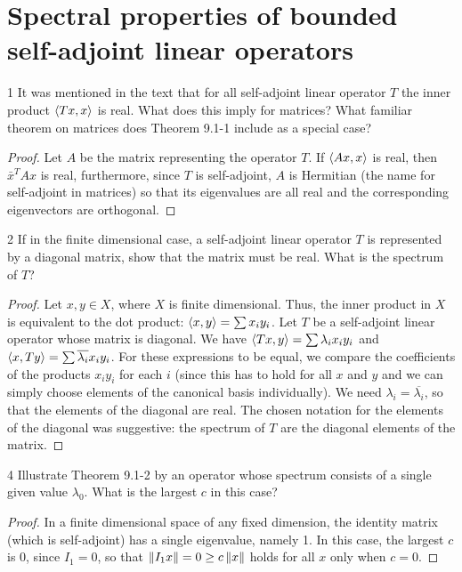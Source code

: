 \section{Spectral properties of bounded self-adjoint linear operators}


\begin{exercise}{1}
It was mentioned in the text that for all self-adjoint linear operator $T$ the inner product $\langle Tx, x\rangle$ is real.
What does this imply for matrices?
What familiar theorem on matrices does Theorem 9.1-1 include as a special case?
\end{exercise}
\begin{proof}
Let $A$ be the matrix representing the operator $T$.
If $\langle Ax, x\rangle$ is real, then $\bar{x}^T A x$ is real, furthermore, since $T$ is self-adjoint, $A$ is Hermitian (the name for self-adjoint in matrices) so that its eigenvalues are all real and the corresponding eigenvectors are orthogonal.
\end{proof} 

\begin{exercise}{2}
If in the finite dimensional case, a self-adjoint linear operator $T$ is represented by a diagonal matrix, show that the matrix must be real.
What is the spectrum of $T$?
\end{exercise}
\begin{proof}
Let $x, y \in X$, where $X$ is finite dimensional.
Thus, the inner product in $X$ is equivalent to the dot product:
$\langle x, y\rangle = \sum x_i y_i$. 
Let $T$ be a self-adjoint linear operator whose matrix is diagonal.
We have $\langle Tx, y\rangle = \sum \lambda_i x_i y_i$ and $\langle x, Ty\rangle = \sum \overline{\lambda_i} x_i y_i$.
For these expressions to be equal, we compare the coefficients of the products $x_i y_i$ for each $i$ (since this has to hold for all $x$ and $y$ and we can simply choose elements of the canonical basis individually).
We need $\lambda_i = \overline{\lambda_i}$, so that the elements of the diagonal are real.
The chosen notation for the elements of the diagonal was suggestive: 
the spectrum of $T$ are the diagonal elements of the matrix.
\end{proof} 

\begin{exercise}{4}
Illustrate Theorem 9.1-2 by an operator whose spectrum consists of a single given value $\lambda_0$.
What is the largest $c$ in this case?
\end{exercise}
\begin{proof}
In a finite dimensional space of any fixed dimension, the identity matrix (which is self-adjoint) has a single eigenvalue, namely 1.
In this case, the largest $c$ is 0, since $I_1 = 0$, so that $\left\lVert I_1 x\right\rVert = 0 \geq c \left\lVert x\right\rVert$ holds for all $x$ only when $c = 0$. 
\end{proof} 

